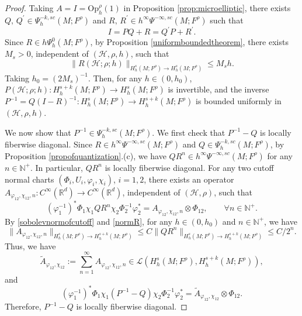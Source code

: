 \documentclass[11pt,oneside,reqno]{amsart}
\newcommand\N{\ensuremath{\mathbb{N}}}
\theoremstyle{definition}
\numberwithin{equation}{section}
\theoremstyle{plain}
\begin{document}
\begin{proof}
Taking $A=I = \mathrm{Op}_h^\rho(1)$ in Proposition \ref{prop:microelliptic}, there exists $Q,\,Q^{\prime}\in \Psi^{-k,sc}_{h}(M;F^\rho)$ and $R,\,R^{\prime}\in h^{\infty}\Psi^{-\infty,sc}(M;F^\rho)$ such that 
\begin{equation*}
I=PQ+R=Q^{\prime}P+R^{\prime}.
\end{equation*}
Since $R \in h\Psi^0_h(M;F^\rho)$, by Proposition \ref{uniformboundedtheorem}, there exists $M_{s}>0$, independent of $(\mathcal{H},\rho,h)$, such that 
\begin{equation}\label{normR}
    \|R(\mathcal{H};\rho;h)\|_{H^s_h(M;F^\rho) \rightarrow H^s_h(M;F^\rho)} \leq M_{s}h.
\end{equation}
Taking $h_0 = (2M_s)^{-1}$. Then, for any $h \in (0,h_0)$, $P(\mathcal{H};\rho;h):H^{s+k}_h(M;F^\rho) \rightarrow H^{s}_h(M;F^\rho) $ is invertible, and the inverse $P^{-1}=Q(I-R)^{-1}:H^{s}_{h}(M;F^\rho)  \rightarrow H^{s+k}_{h}(M;F^{\rho})$ is bounded uniformly in $(\mathcal{H},\rho,h)$. 

We now show that $P^{-1} \in \Psi_{h}^{-k,sc}(M;F^\rho)$. We first check that $P^{-1} -Q$ is locally fiberwise diagonal. Since $R\in h^{\infty}\Psi^{-\infty,sc}(M;F^\rho)$ and $Q \in \Psi^{-k,sc}_{h}(M;F^\rho)$, by Proposition \ref{propofquantization}.(c), we have $QR^n \in h^{\infty}\Psi^{-\infty,sc}(M;F^\rho)$ for any $n\in \N^+$. In particular, $QR^n$ is locally fiberwise diagonal. For any two cutoff normal charts $(\Phi_i, U_i,\varphi_i,\chi_i)$, $i=1,2$, there exists an operator $A_{\varphi_{12},\chi_{12},n}: C^{\infty}(\mathbb R^d)\to C^{\infty}(\mathbb R^d)$, independent of $(\mathcal{H},\rho)$, such that
\begin{equation*}
    (\varphi_{1}^{-1})^*\Phi_{1}\chi_{1}QR^{n}\chi_{2} \Phi_2^{-1}\varphi_2^* = A_{\varphi_{12},\chi_{12},n} \otimes \Phi_{12}, \qquad \forall n \in \N^+.
\end{equation*}
By \eqref{sobolevnormofcutoff} and \eqref{normR}, for any $h\in (0,h_0)$ and $n\in \N^+$, we have
\begin{equation*}
    \|A_{\varphi_{12},\chi_{12},n}\|_{H^{s}_{h}(M;F^\rho)\to H^{s+k}_h(M;F^\rho)}\leq C \|QR^{n}\|_{H^{s}_{h}(M;F^\rho)\to H^{s+k}_h(M;F^\rho)}\leq C/2^n.
\end{equation*}
Thus, we have 
\begin{equation*}
    \widetilde{A}_{\varphi_{12},\chi_{12}}:=\sum_{n=1}^{\infty}A_{\varphi_{12},\chi_{12},n} \in \mathcal{L}(H^{s}_h(M;F^\rho),H^{s+k}_h(M;F^\rho)),
\end{equation*}
and
\begin{equation}\label{differentcpocharts}
(\varphi_{1}^{-1})^*\Phi_{1}\chi_{1}(P^{-1}-Q)\chi_{2} \Phi_2^{-1}\varphi_2^* =\widetilde{A}_{\varphi_{12},\chi_{12}}\otimes \Phi_{12}.
\end{equation}
Therefore, $P^{-1} -Q$ is locally fiberwise diagonal.


\end{proof}
\end{document}

